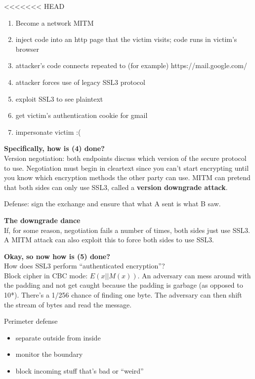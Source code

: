 <<<<<<< HEAD

\begin{enumerate}
	\item Become a network MITM 
	\item inject code into an http page that the victim visits; code runs in victim's browser
	\item attacker's code connects repeated to (for example) https://mail.google.com/
	\item attacker forces use of legacy SSL3 protocol
	\item exploit SSL3 to see plaintext
	\item get victim's authentication cookie for gmail
	\item impersonate victim :(
\end{enumerate}

\textbf{Specifically, how is (4) done?}\\
Version negotiation: both endpoints discuss which version of the secure protocol to use. Negotiation must begin in cleartext since you can't start encrypting until you know which encryption methods the other party can use. MITM can pretend that both sides can only use SSL3, called a \textbf{version downgrade attack}.

Defense: sign the exchange and ensure that what A sent is what B saw.

\textbf{The downgrade dance}\\
If, for some reason, negotiation fails a number of times, both sides just use SSL3. A MITM attack can also exploit this to force both sides to use SSL3.

\textbf{Okay, so now how is (5) done?}\\
How does SSL3 perform ``authenticated encryption''?\\
Block cipher in CBC mode: $E(x || M(x))$. An adversary can mess around with the padding and not get caught because the padding is garbage (as opposed to 10*). There's a 1/256 chance of finding one byte. The adversary can then shift the stream of bytes and read the message.

Perimeter defense
\begin{itemize}
	\item separate outside from inside
	\item monitor the boundary
	\item block incoming stuff that's bad or ``weird''
\end{itemize}

